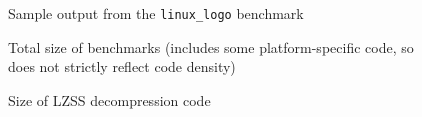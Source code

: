 \documentclass{article}[10pt]
\begin{document}





\begin{figure}[tbp]
\begin{center}
\end{center}
\caption{Sample output from the {\tt linux\_logo} benchmark}
\label{figure:ll}
\end{figure}

%
%

\noindent




\begin{figure}[tbp]
\begin{center}
\end{center}
\caption{Total size of benchmarks 
(includes some platform-specific code, so does not
strictly reflect code density)}
\label{figure:total}
\end{figure}

\begin{figure}[tbp]
\begin{center}
\end{center}
\caption{Size of LZSS decompression code}
\label{figure:decomp}
\end{figure}
\end{document}
